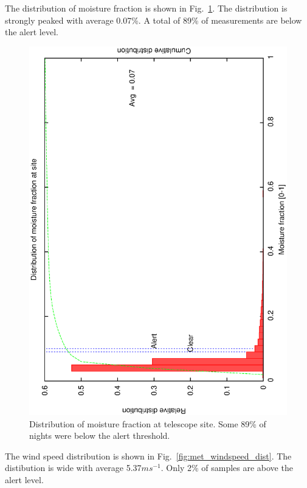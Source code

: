 The distribution of moisture fraction is shown in Fig.~\ref{fig:met_moisture_dist}. The distribution is strongly peaked with average 0.07\%. A total of 89\% of measurements are below the alert level.

\begin{figure}[htbp]
\begin{center}
     \includegraphics[scale=0.4, angle=-90]{figures/ecs/moist.eps}
\end{center}
\caption[Distribution of moisture fraction at telescope site.]
{Distribution of moisture fraction at telescope site. Some 89\% of nights were below the alert threshold.}
\label{fig:met_moisture_dist}
\end{figure}




The wind speed distribution is shown in Fig.~\ref{fig:met_windspeed_dist}. The distibution is wide with average 5.37$ms^{-1}$. Only 2\% of samples are above the alert level.

